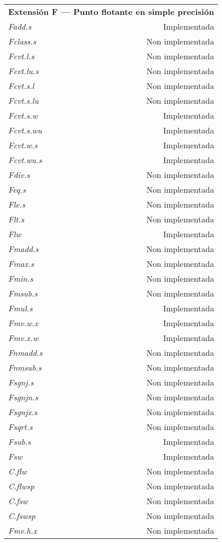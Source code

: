 \begin{longtable}{l|r}
    \multicolumn{2}{c}{\textbf{Extensión F — Punto flotante en simple precisión}} \\
    \textit{Fadd.s} & Implementada \\
    \textit{Fclass.s} & Non implementada \\
    \textit{Fcvt.l.s} & Non implementada \\
    \textit{Fcvt.lu.s} & Non implementada \\
    \textit{Fcvt.s.l} & Non implementada \\
    \textit{Fcvt.s.lu} & Non implementada \\
    \textit{Fcvt.s.w} & Implementada \\
    \textit{Fcvt.s.wu} & Implementada \\
    \textit{Fcvt.w.s} & Implementada \\
    \textit{Fcvt.wu.s} & Implementada \\
    \textit{Fdiv.s} & Non implementada \\
    \textit{Feq.s} & Non implementada \\
    \textit{Fle.s} & Non implementada \\
    \textit{Flt.s} & Non implementada \\
    \textit{Flw} & Implementada \\
    \textit{Fmadd.s} & Non implementada \\
    \textit{Fmax.s} & Non implementada \\
    \textit{Fmin.s} & Non implementada \\
    \textit{Fmsub.s} & Non implementada \\
    \textit{Fmul.s} & Implementada \\
    \textit{Fmv.w.x} & Implementada \\
    \textit{Fmv.x.w} & Implementada \\
    \textit{Fnmadd.s} & Non implementada \\
    \textit{Fnmsub.s} & Non implementada \\
    \textit{Fsgnj.s} & Non implementada \\
    \textit{Fsgnjn.s} & Non implementada \\
    \textit{Fsgnjx.s} & Non implementada \\
    \textit{Fsqrt.s} & Non implementada \\
    \textit{Fsub.s} & Implementada \\
    \textit{Fsw} & Implementada \\
    \textit{C.flw} & Non implementada \\
    \textit{C.flwsp} & Non implementada \\
    \textit{C.fsw} & Non implementada \\
    \textit{C.fswsp} & Non implementada \\
    \textit{Fmv.h.x} & Non implementada \\


\end{longtable}
